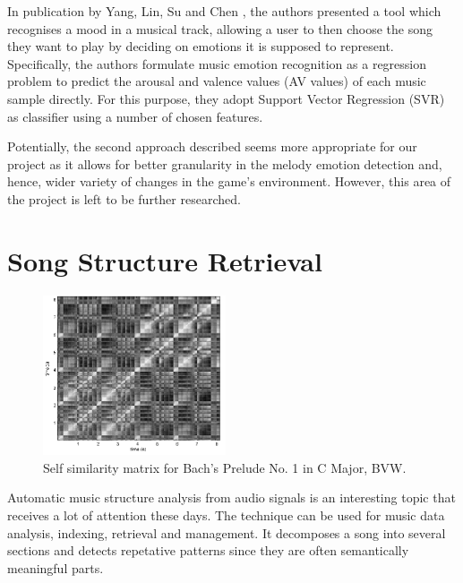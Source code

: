 In publication by Yang, Lin, Su and Chen \cite{mood}, the authors presented a tool which recognises a mood in a musical track, allowing a user to then choose the song they want to play by deciding on emotions it is supposed to represent.
Specifically, the authors formulate music emotion recognition as a regression problem to predict the arousal and valence values (AV values) of each music sample directly. For this purpose, they adopt Support Vector Regression (SVR) as classifier using a number of chosen features.

Potentially, the second approach described seems more appropriate for our project as it allows for better granularity in the melody emotion detection and, hence, wider variety of changes in the game's environment. However, this area of the project is left to be further researched.

\vspace{20pt}

\section{Song Structure Retrieval}

\begin{figure}
  \vspace{-10pt}

  \begin{center}
    \includegraphics[width=0.48\textwidth]{Figures/SSM_beat}
  \end{center}
  \caption{Self similarity matrix for Bach's Prelude No. 1 in C Major, BVW.}
  \label{fig:SSMbach}
\end{figure}

Automatic music structure analysis from audio signals is an interesting topic that receives a lot of attention these days. The technique can be used for music data analysis, indexing, retrieval and management. It decomposes a song
into several sections and detects repetative patterns since they are often semantically meaningful parts. 

